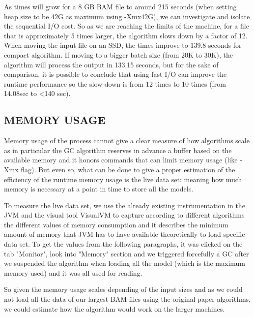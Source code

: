 \documentclass[a4paper,twoside]{article}
\begin{document}
As times will grow for a 8 GB BAM file to around 215 seconds (when setting heap size to be 42G as maximum using -Xmx42G), we can investigate and isolate the sequential I/O cost. So as we are reaching the limits of the machine, for a file that is approximately 5 times larger, the algorithm slows down by a factor of 12. When moving the input file on an SSD, the times improve to 139.8 seconds for compact algorithm. If moving to a bigger batch size (from 20K to 30K), the algorithm will process the output in 133.15 seconds, but for the sake of comparison, it is possible to conclude that using fast I/O can improve the runtime performance so the slow-down is from 12 times to 10 times (from 14.08sec to <140 sec).




\subsection{\uppercase{Memory Usage}}
Memory usage of the process cannot give a clear measure of how algorithms scale as in particular the GC algorithm reserves in advance a buffer based on the available memory and it honors commands that can limit memory usage (like -Xmx flag). But even so, what can be done to give a proper estimation of the efficiency of the runtime memory usage is the live data set: meaning how much memory is necessary at a point in time to store all the models.

To measure the live data set, we use the already existing instrumentation in the JVM and the visual tool
VisualVM to capture according to different algorithms the different values of memory consumption and it describes the minimum amount of memory that JVM has to have available theoretically to load specific data set. To get the values from the following paragraphs, it was clicked on the tab "Monitor", look into "Memory" section and we triggered forcefully a GC after we suspended the algorithm when loading all the model (which is the maximum memory used) and it was all used for reading.

So given the memory usage scales depending of the input sizes and as we could not load all the data of
our largest BAM files using the original paper algorithms, we could estimate how the algorithm would work on the larger machines.
\end{document}
